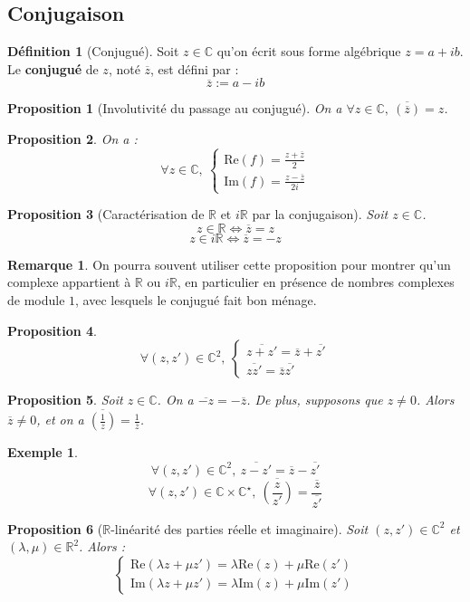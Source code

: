 \documentclass[french]{book}
\newcommand{\R}{\mathbb{R}}
\newcommand{\C}{\mathbb{C}}
\newcommand{\st}{^\star}
\theoremstyle{plain}
\newtheorem{prop}{Proposition}[chapter]
\theoremstyle{definition}
\newtheorem{dfn}{Définition}[chapter]
\newtheorem{exa}{Exemple}[chapter]
\newtheorem{rmq}{Remarque}[chapter]
\theoremstyle{remark}
\begin{document}
\subsection{Conjugaison}
\begin{dfn}[Conjugué]
	Soit $z \in \C$ qu'on écrit sous forme algébrique $z=a+ib$. Le \textbf{conjugué} de $z$, noté $\overline{z}$, est défini par : $$\overline{z}:=a-ib$$
\end{dfn}
\begin{prop}[Involutivité du passage au conjugué]
	On a $\forall z\in\C,\ \overline{(\overline{z})}=z$.
\end{prop}
\begin{prop}
	On a :
	$$\forall z\in\C,\ \begin{cases}
		\displaystyle\text{Re}(f)=\frac{z+\overline{z}}{2} \\
		\displaystyle\text{Im}(f)=\frac{z-\overline{z}}{2i}
	\end{cases}$$
\end{prop}
\begin{prop}[Caractérisation de $\R$ et $i\R$ par la conjugaison]
	Soit $z\in\C$.$$z\in\R\iff \overline{z}=z$$ $$z\in i\R\iff \overline{z}=-z$$
\end{prop}
\begin{rmq}
	On pourra souvent utiliser cette proposition pour montrer qu'un complexe appartient à $\R$ ou $i\R$, en particulier en présence de nombres complexes de module $1$, avec lesquels le conjugué fait bon ménage.
\end{rmq}
\begin{prop}
	$$\forall (z,z')\in\C^2,\ \begin{cases}
		\overline{z+z'}=\overline{z}+\overline{z'} \\
		\overline{zz'}=\overline{z}\overline{z'}
	\end{cases}$$
\end{prop}
\begin{prop}
	Soit $z\in\C$. On a $\overline{-z}=-\overline{z}$. De plus, supposons que $z\ne0$. Alors $\overline{z}\ne 0$, et on a $\displaystyle\overline{\left(\frac{1}{z}\right)}=\frac{1}{\overline{z}}$.
\end{prop}

\begin{exa}
	$$\forall(z,z')\in\C^2,\ \overline{z-z'}=\overline{z}-\overline{z'}$$
	$$\forall(z,z')\in\C\times\C\st,\ \overline{\left(\frac{z}{z'}\right)}=\frac{\overline{z}}{\overline{z'}}$$
\end{exa}
\begin{prop}[$\R$-linéarité des parties réelle et imaginaire]
	Soit $(z,z')\in\C^2$ et $(\lambda,\mu)\in\R^2$. Alors : $$\begin{cases}
		\text{Re}(\lambda z+\mu z')=\lambda\text{Re}(z)+\mu\text{Re}(z') \\
		\text{Im}(\lambda z+\mu z')=\lambda\text{Im}(z)+\mu\text{Im}(z')
	\end{cases}$$
\end{prop}
\end{document}

